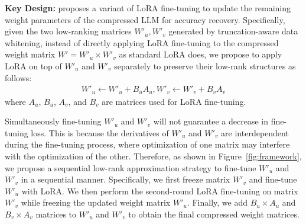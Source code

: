 \textbf{Key Design:} 
%
\sysname proposes a variant of LoRA fine-tuning to update the remaining weight parameters of the compressed LLM for accuracy recovery. 
%
Specifically, given the two low-ranking matrices $W'_u, W'_v$ generated by truncation-aware data whitening,
instead of directly applying LoRA fine-tuning to the compressed weight matrix $W' = W'_u\times W'_v$ as standard LoRA does, we propose to apply LoRA on top of $W'_u$ and $W'_v$ separately to preserve their low-rank structures as follows:
\begin{align}
    W'_u \leftarrow W'_u + B_uA_u, W'_v\leftarrow W'_v + B_vA_v
\end{align}
where $A_u$, $B_u$, $A_v$, and $B_v$ are matrices used for LoRA fine-tuning. 

%
Simultaneously fine-tuning $W'_u$ and $W'_v$ will not guarantee a decrease in fine-tuning loss. This is because the derivatives of $W'_u$ and $W'_v$ are interdependent during the fine-tuning process, where optimization of one matrix may interfere with the optimization of the other. 
%
Therefore, as shown in Figure~\ref{fig:framework}, we propose a sequential low-rank approximation strategy to fine-tune $W'_u$ and $W'_v$ in a sequential manner. 
%
Specifically, we first freeze matrix $W'_v$ and fine-tune $W'_u$ with LoRA. We then perform the second-round LoRA fine-tuning on matrix $W'_v$ while freezing the updated weight matrix $W'_u$. Finally, we add $B_u\times A_u$ and $B_v\times A_v$ matrices to $W'_u$ and $W'_v$ to obtain the final compressed weight matrices.
